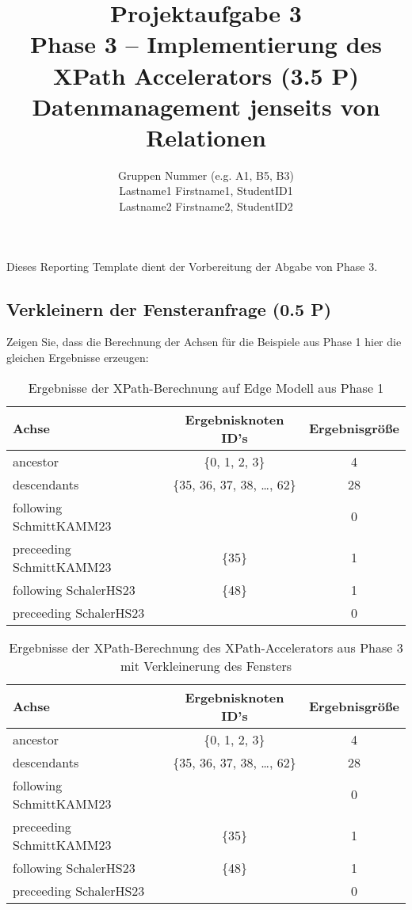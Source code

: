 \documentclass[11pt]{scrartcl}
\title{
  \textbf{\large Projektaufgabe 3 } \\
  Phase 3 – Implementierung des XPath Accelerators (3.5 P) \\
  {\large Datenmanagement jenseits von Relationen}
}
\author{
  Gruppen Nummer (e.g. A1, B5, B3) \\
  \large Lastname1 Firstname1, StudentID1 \\
  \large Lastname2 Firstname2, StudentID2 
}
\begin{document}
\maketitle\thispagestyle{empty}

Dieses Reporting Template dient der Vorbereitung der Abgabe von Phase 3. 

\subsection*{Verkleinern der Fensteranfrage (0.5 P)}

Zeigen Sie, dass die Berechnung der Achsen für die Beispiele aus Phase 1 hier die gleichen Ergebnisse erzeugen:

\begin{table}[h]
	\centering
		\begin{center}
			\begin{tabular}{ l | c c }
				\toprule
				Achse & Ergebnisknoten ID's & Ergebnisgröße\\
				\midrule
				ancestor & \{0, 1, 2, 3\} & 4 \\
				descendants & \{35, 36, 37, 38, \ldots, 62\} & 28 \\
				following SchmittKAMM23 & \emptyset & 0 \\
				preceeding SchmittKAMM23 & \{35\} & 1 \\
				following SchalerHS23 & \{48\} & 1 \\
				preceeding SchalerHS23 & \emptyset & 0 \\
				\bottomrule
			\end{tabular}
			\end{center}
	\caption{Ergebnisse der XPath-Berechnung auf Edge Modell aus Phase 1}
	\label{tab:ErgebnisseDerXPathBerechnug1}
\end{table}

\begin{table}[h]
	\centering
		\begin{center}
			\begin{tabular}{ l | c c }
				\toprule
				Achse & Ergebnisknoten ID's & Ergebnisgröße\\
				\midrule
				ancestor & \{0, 1, 2, 3\} & 4 \\
				descendants & \{35, 36, 37, 38, \ldots, 62\} & 28 \\
				following SchmittKAMM23 & \emptyset & 0 \\
				preceeding SchmittKAMM23 & \{35\} & 1 \\
				following SchalerHS23 & \{48\} & 1 \\
				preceeding SchalerHS23 & \emptyset & 0 \\
				\bottomrule
			\end{tabular}
			\end{center}
	\caption{Ergebnisse der XPath-Berechnung des XPath-Accelerators aus Phase 3 mit Verkleinerung des Fensters}
	\label{tab:ErgebnisseDerXPathBerechnug2}
\end{table}
\end{document}
